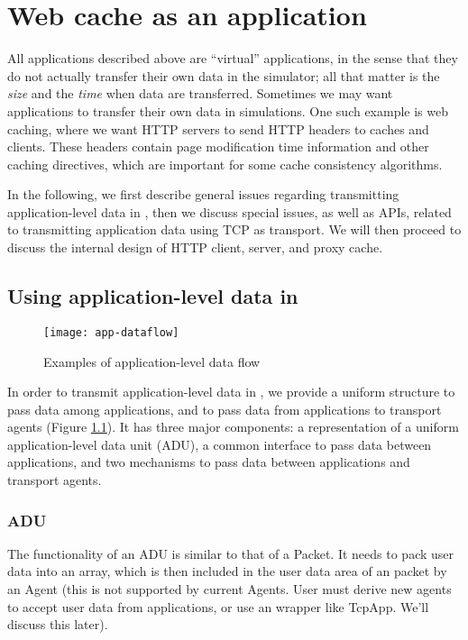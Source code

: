 \chapter{Web cache as an application}
\label{chap:webcache}

All applications described above are ``virtual'' applications, in the sense
that they do not actually transfer their own data in the simulator; all 
that matter is the \emph{size} and the \emph{time} when data are transferred.
Sometimes we may want applications to transfer their own data in simulations.
One such example is web caching, where we want HTTP servers to send HTTP 
headers to caches and clients. These headers contain 
page modification time information and other caching directives, which are 
important for some cache consistency algorithms.

In the following, we first describe general issues regarding
transmitting application-level data in \ns, then we discuss special
issues, as well as APIs, related to transmitting application data
using TCP as transport. We will then proceed to discuss the internal
design of HTTP client, server, and proxy cache. 

\section{Using application-level data in \ns}

\begin{figure}[tb]
  \begin{center}
    \centerline{\texttt{[image: app-dataflow]}}
    \caption{Examples of application-level data flow}
    \label{fig:app-dataflow}
  \end{center}
\end{figure}

In order to transmit application-level data in \ns, we provide a 
uniform structure to pass data among applications, and to
pass data from applications to transport agents (Figure
\ref{fig:app-dataflow}). It has three major components: 
a representation of a uniform application-level data unit (ADU), a 
common interface to pass data between applications, and two mechanisms
to pass data between applications and transport agents.

\subsection{ADU} 

The functionality of an ADU is similar to that of a Packet. It needs to
pack user data into an array, which is then included in the user data
area of an \ns packet by an Agent (this is not supported by current
Agents. User must derive new agents to accept user data from
applications, or use an wrapper like TcpApp. We'll discuss this
later). 

